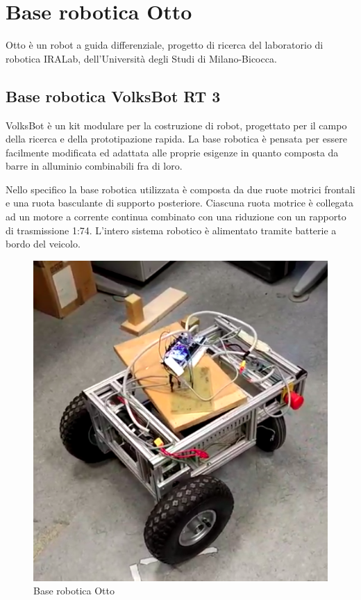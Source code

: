 \chapter{Base robotica Otto}

Otto è un robot a guida differenziale, progetto di ricerca del laboratorio di robotica IRALab, dell’Università degli Studi di Milano-Bicocca.

\section{Base robotica VolksBot RT 3}
VolksBot è un kit modulare per la costruzione di robot, progettato per il campo della ricerca e della  prototipazione rapida.
La base robotica è pensata per essere facilmente modificata ed adattata alle proprie esigenze in quanto composta da barre in alluminio combinabili fra di loro.

Nello specifico la base robotica utilizzata è composta da due ruote motrici frontali e una ruota basculante di supporto posteriore.
Ciascuna ruota motrice è collegata ad un motore a corrente continua combinato con una riduzione con un rapporto di trasmissione 1:74.
L'intero sistema robotico è alimentato tramite batterie a bordo del veicolo.
\begin{figure}[H]
\centering
\includegraphics[scale=0.45]{images/otto1.png}
\caption{Base robotica Otto}
\end{figure}

